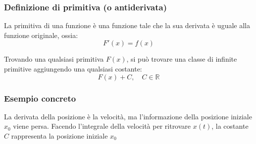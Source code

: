 \documentclass{article}
\begin{document}
\subsubsection{Definizione di primitiva (o antiderivata)}
La primitiva di una funzione è una funzione tale che la sua derivata è uguale alla funzione
originale, ossia:
\[
    F'(x)=f(x)    
\]

Trovando una qualsiasi primitiva \(F(x)\), si può trovare una classe di infinite primitive
aggiungendo una qualsiasi costante:
\[
    F(x)+C,
    \quad C\in\mathbb{R}  
\]

\subsubsection{Esempio concreto}
La derivata della posizione è la velocità, ma l'informazione della posizione iniziale \(x_0\)
viene persa. Facendo l'integrale della velocità per ritrovare \(x(t)\), la costante \(C\)
rappresenta la posizione iniziale \(x_0\)
\end{document}
